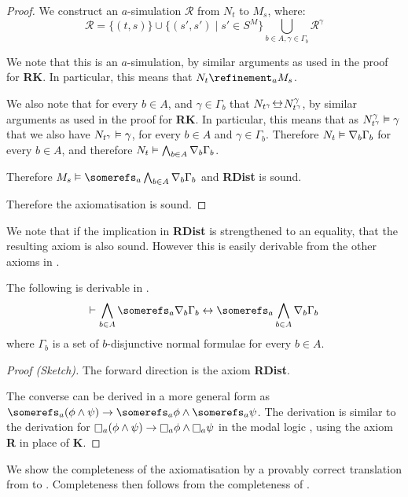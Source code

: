 \begin{proof}
We construct an $a$-simulation $\mathcal{R}$ from $N_t$ to $M_s$, where:
$$\mathcal{R} = \{(t, s)\} \cup \{(s', s') \mid s' \in S^M\} \bigcup_{b \in A,
\gamma \in \Gamma_b} \mathcal{R}^\gamma$$

We note that this is an $a$-simulation, by similar arguments as used in the
proof for {\bf RK}. In particular, this means that $N_t \refinement_a M_s$.

We also note that for every $b \in A$, and $\gamma \in \Gamma_b$ that
$N_{t^\gamma} \bisim N^\gamma_{t^\gamma}$, by similar arguments as used in the
proof for {\bf RK}. In particular, this means that as $N^\gamma_{t^\gamma}
\vDash \gamma$ that we also have $N_{t^\gamma} \vDash \gamma$, for every $b
\in A$ and $\gamma \in \Gamma_b$. Therefore $N_t \vDash \nabla_b \Gamma_b$
for every $b \in A$, and therefore $N_t \vDash \bigwedge_{b \in A} \nabla_b
\Gamma_b$.

Therefore $M_s \entails \somerefs_a \bigwedge_{b \in A} \covers_b \Gamma_b$ and
{\bf RDist} is sound.

Therefore the axiomatisation \axiomKF{} is sound.
\end{proof}

We note that if the implication in {\bf RDist} is strengthened to an equality,
that the resulting axiom is also sound. However this is easily derivable from
the other axioms in \axiomKF{}.

\begin{lemma}\label{k-rdist-converse}
The following is derivable in \axiomKF{}.
$$
\proves \bigwedge_{b \in A} \somerefs_a \covers_b \Gamma_b \iff
\somerefs_a \bigwedge_{b \in A} \covers_b \Gamma_b \\
$$
where $\Gamma_b$ is a set of $b$-disjunctive normal formulae for
every $b \in A$.
\end{lemma}

\begin{proof}[Proof (Sketch)]
The forward direction is the axiom {\bf RDist}. 

The converse can be derived in a more general form as $\somerefs_a (\phi \land
\psi) \implies \somerefs_a \phi \land \somerefs_a \psi$. The derivation is
similar to the derivation for $\knows_a (\phi \land \psi) \implies \knows_a \phi
\land \knows_a \psi$ in the modal logic \logicK{}, using the axiom {\bf R} in
place of {\bf K}.
\end{proof}

We show the completeness of the axiomatisation \axiomKF{} by a provably correct
translation from \langF{} to \lang{}. Completeness then follows from the
completeness of \logicK{}.

